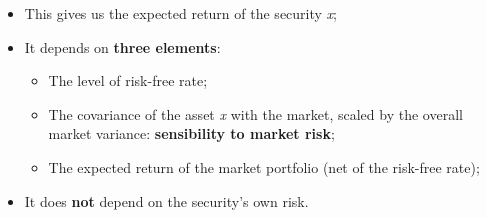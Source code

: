 \documentclass[11pt,a4paper]{report}
\begin{document}
\begin{itemize}
    \item This gives us the expected return of the security \textit{x};
    \item It depends on \textbf{three elements}:
    \begin{itemize}
        \item The level of risk-free rate;
        \item The covariance of the asset \textit{x} with the market, scaled by the overall market variance: \textbf{sensibility to market risk};
        \item The expected return of the market portfolio (net of the risk-free rate);
    \end{itemize}
    \item It does \textbf{not} depend on the security's own risk.
\end{itemize}
\end{document}
